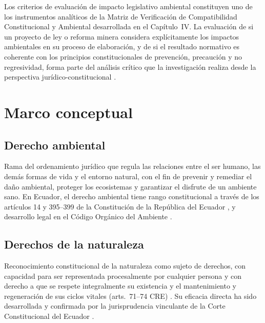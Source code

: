 Los criterios de evaluación de impacto legislativo ambiental constituyen uno de los instrumentos analíticos de la Matriz de Verificación de Compatibilidad Constitucional y Ambiental desarrollada en el Capítulo~IV. La evaluación de si un proyecto de ley o reforma minera considera explícitamente los impactos ambientales en su proceso de elaboración, y de si el resultado normativo es coherente con los principios constitucionales de prevención, precaución y no regresividad, forma parte del análisis crítico que la investigación realiza desde la perspectiva jurídico-constitucional \parencite{cre_2008}.

\section{Marco conceptual}

\subsection{Derecho ambiental}

Rama del ordenamiento jurídico que regula las relaciones entre el ser humano, las demás formas de vida y el entorno natural, con el fin de prevenir y remediar el daño ambiental, proteger los ecosistemas y garantizar el disfrute de un ambiente sano. En Ecuador, el derecho ambiental tiene rango constitucional a través de los artículos 14 y 395--399 de la Constitución de la República del Ecuador \parencite{cre_2008}, y desarrollo legal en el Código Orgánico del Ambiente \parencite{coa_2017}.

\subsection{Derechos de la naturaleza}

Reconocimiento constitucional de la naturaleza como sujeto de derechos, con capacidad para ser representada procesalmente por cualquier persona y con derecho a que se respete integralmente su existencia y el mantenimiento y regeneración de sus ciclos vitales (arts.\ 71--74 CRE) \parencite{cre_2008}. Su eficacia directa ha sido desarrollada y confirmada por la jurisprudencia vinculante de la Corte Constitucional del Ecuador \parencite{cce_1149_19_jp_21}.

